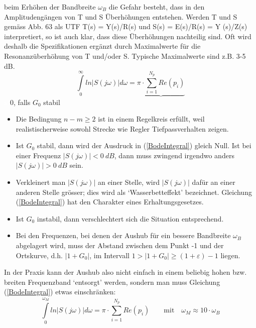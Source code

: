 beim Erhöhen der Bandbreite $\omega_B$
die Gefahr besteht, dass in den Amplitudengängen von T und S Überhöhungen
entstehen. Werden T und S gemäss Abb. 63 als UTF T(s) = Y(s)/R(s) und
S(s) = E(s)/R(s) = Y (s)/Z(s) interpretiert, so ist auch klar, dass diese Überhöhungen
nachteilig sind. Oft wird deshalb die Spezifikationen ergänzt durch Maximalwerte für die Resonanzüberhöhung von
T und/oder S. Typische Maximalwerte sind z.B. 3-5 dB.
\begin{equation}
\int\limits_{0}^{\infty}ln|S(j\omega)|d\omega =\underbrace{\pi\cdot\sum\limits_{i=1}^{N_{p}}Re(p_i)}
\label{BodeIntegral}
\end{equation}
\textcolor{white}{x} \hspace{9.5cm} 0, falls $G_0$ stabil 
\begin{itemize}
	\item Die Bedingung $n-m \geq 2$ ist in einem Regelkreis erfüllt, weil realistischerweise
	sowohl Strecke wie Regler Tiefpassverhalten zeigen.
	\item Ist $G_0$ stabil, dann wird der Ausdruck in (\ref{BodeIntegral}) gleich Null. Ist bei einer Frequenz
	$|S(j\omega)| < 0 \ dB$, dann muss zwingend irgendwo anders $|S(j\omega)| > 0 \ dB$ sein.
	\item Verkleinert man $|S(j\omega)|$ an einer Stelle, wird $|S(j\omega)|$ dafür an einer anderen
	Stelle grösser; dies wird als ‘Wasserbetteffekt’ bezeichnet.
	Gleichung (\ref{BodeIntegral}) hat den Charakter eines Erhaltungsgesetzes.
	\item Ist $G_0$ instabil, dann verschlechtert sich die Situation entsprechend.
	\item Bei den Frequenzen, bei denen
	der Aushub für ein bessere Bandbreite $\omega_B$ abgelagert wird, muss der Abstand zwischen dem Punkt -1 und der
	Ortskurve, d.h. $|1 + G_0|$, im Intervall $1 > |1 + G_0| \geq (1 + \varepsilon)-1$ liegen.
\end{itemize}

In der Praxis kann der Aushub also nicht einfach in einem beliebig hohen bzw.
breiten Frequenzband ‘entsorgt’ werden, sondern man muss Gleichung (\ref{BodeIntegral}) etwas
einschränken:
\begin{equation}
\int\limits_{0}^{\omega_M}ln|S(j\omega)|d\omega =\pi\cdot\sum\limits_{i=1}^{N_{p}}Re(p_i) \qquad \text{mit} \quad \omega_M \approx 10 \cdot \omega_B
\end{equation}